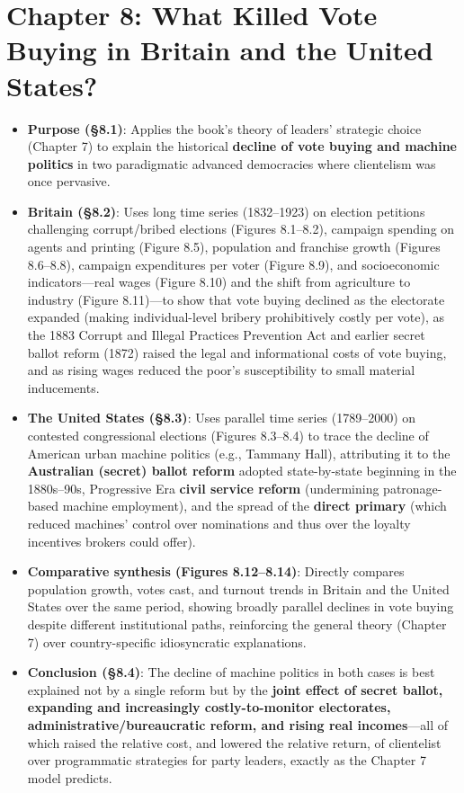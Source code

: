 \documentclass[12pt]{article}
\begin{document}
\section{Chapter 8: What Killed Vote Buying in Britain and the United States?}

\begin{itemize}[leftmargin=*, itemsep=4pt]
    \item \textbf{Purpose (\S8.1)}: Applies the book's theory of leaders' strategic choice (Chapter 7) to explain the historical \textbf{decline of vote buying and machine politics} in two paradigmatic advanced democracies where clientelism was once pervasive.
    \item \textbf{Britain (\S8.2)}: Uses long time series (1832--1923) on election petitions challenging corrupt/bribed elections (Figures 8.1--8.2), campaign spending on agents and printing (Figure 8.5), population and franchise growth (Figures 8.6--8.8), campaign expenditures per voter (Figure 8.9), and socioeconomic indicators---real wages (Figure 8.10) and the shift from agriculture to industry (Figure 8.11)---to show that vote buying declined as the electorate expanded (making individual-level bribery prohibitively costly per vote), as the 1883 Corrupt and Illegal Practices Prevention Act and earlier secret ballot reform (1872) raised the legal and informational costs of vote buying, and as rising wages reduced the poor's susceptibility to small material inducements.
    \item \textbf{The United States (\S8.3)}: Uses parallel time series (1789--2000) on contested congressional elections (Figures 8.3--8.4) to trace the decline of American urban machine politics (e.g., Tammany Hall), attributing it to the \textbf{Australian (secret) ballot reform} adopted state-by-state beginning in the 1880s--90s, Progressive Era \textbf{civil service reform} (undermining patronage-based machine employment), and the spread of the \textbf{direct primary} (which reduced machines' control over nominations and thus over the loyalty incentives brokers could offer).
    \item \textbf{Comparative synthesis (Figures 8.12--8.14)}: Directly compares population growth, votes cast, and turnout trends in Britain and the United States over the same period, showing broadly parallel declines in vote buying despite different institutional paths, reinforcing the general theory (Chapter 7) over country-specific idiosyncratic explanations.
    \item \textbf{Conclusion (\S8.4)}: The decline of machine politics in both cases is best explained not by a single reform but by the \textbf{joint effect of secret ballot, expanding and increasingly costly-to-monitor electorates, administrative/bureaucratic reform, and rising real incomes}---all of which raised the relative cost, and lowered the relative return, of clientelist over programmatic strategies for party leaders, exactly as the Chapter 7 model predicts.
\end{itemize}
\end{document}
